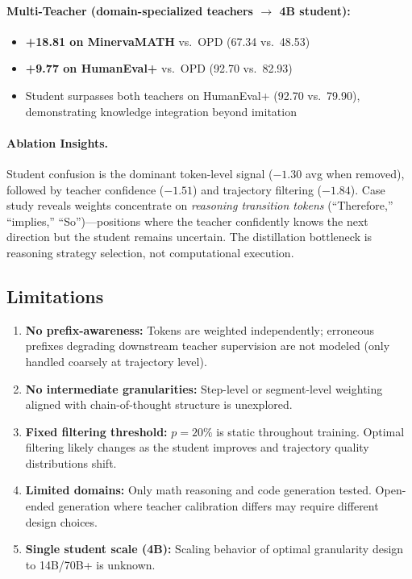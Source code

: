 \documentclass[11pt,a4paper]{article}
\begin{document}
\paragraph{Multi-Teacher (domain-specialized teachers $\to$ 4B student):}
\begin{itemize}
\item \textbf{+18.81 on MinervaMATH} vs.\ OPD (67.34 vs.\ 48.53)
\item \textbf{+9.77 on HumanEval+} vs.\ OPD (92.70 vs.\ 82.93)
\item Student surpasses both teachers on HumanEval+ (92.70 vs.\ 79.90), demonstrating knowledge integration beyond imitation
\end{itemize}

\paragraph{Ablation Insights.}
Student confusion is the dominant token-level signal ($-1.30$ avg when removed), followed by teacher confidence ($-1.51$) and trajectory filtering ($-1.84$). Case study reveals weights concentrate on \emph{reasoning transition tokens} (``Therefore,'' ``implies,'' ``So'')---positions where the teacher confidently knows the next direction but the student remains uncertain. The distillation bottleneck is reasoning strategy selection, not computational execution.

\subsection{Limitations}

\begin{enumerate}
\item \textbf{No prefix-awareness:} Tokens are weighted independently; erroneous prefixes degrading downstream teacher supervision are not modeled (only handled coarsely at trajectory level).
\item \textbf{No intermediate granularities:} Step-level or segment-level weighting aligned with chain-of-thought structure is unexplored.
\item \textbf{Fixed filtering threshold:} $p{=}20\%$ is static throughout training. Optimal filtering likely changes as the student improves and trajectory quality distributions shift.
\item \textbf{Limited domains:} Only math reasoning and code generation tested. Open-ended generation where teacher calibration differs may require different design choices.
\item \textbf{Single student scale (4B):} Scaling behavior of optimal granularity design to 14B/70B+ is unknown.
\end{enumerate}
\end{document}
